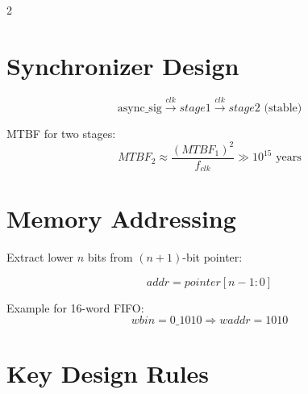 \documentclass[10pt,landscape]{article}
\begin{document}
\begin{multicols}{2}
\section*{Synchronizer Design}

\begin{tcolorbox}[colback=orange!5,colframe=orange!75!black,title=Two-Stage Synchronizer]
\begin{equation*}
\text{async\_sig} \xrightarrow{clk} stage1 \xrightarrow{clk} stage2 \text{ (stable)}
\end{equation*}

MTBF for two stages:
\begin{equation*}
MTBF_2 \approx \frac{(MTBF_1)^2}{f_{clk}} \gg 10^{15} \text{ years}
\end{equation*}
\end{tcolorbox}

\section*{Memory Addressing}

\begin{tcolorbox}[colback=purple!5,colframe=purple!75!black,title=Address Extraction]
Extract lower $n$ bits from $(n+1)$-bit pointer:

\begin{equation*}
addr = pointer[n-1:0]
\end{equation*}

Example for 16-word FIFO:
\begin{equation*}
wbin = 0\_1010 \Rightarrow waddr = 1010
\end{equation*}
\end{tcolorbox}

\columnbreak

\section*{Key Design Rules}


\end{multicols}
\end{document}

